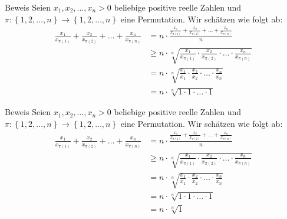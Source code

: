 \documentclass[10pt]{beamer}
\begin{document}
\begin{frame}{Beweis}
    Seien \( x_{1}, x_{2}, \ldots, x_{n} > 0 \) beliebige positive reelle Zahlen und \( \pi: \left\{ 1, 2, \ldots, n \right\} \to \left\{ 1, 2, \ldots, n \right\} \) eine Permutation. Wir schätzen wie folgt ab:
    \begin{align*}
        \frac{x_{1}}{x_{\pi\left( 1 \right)}} + \frac{x_{2}}{x_{\pi\left( 2 \right)}} + \ldots + \frac{x_{n}}{x_{\pi\left( n \right)}}
        & = n \cdot \frac{\frac{x_{1}}{x_{\pi\left( 1 \right)}} + \frac{x_{2}}{x_{\pi\left( 2 \right)}} + \ldots + \frac{x_{n}}{x_{\pi\left( n \right)}}}{n} \\
        & \geq n \cdot \sqrt[n]{\frac{x_{1}}{x_{\pi\left( 1 \right)}} \cdot \frac{x_{2}}{x_{\pi\left( 2 \right)}} \cdot \ldots \cdot \frac{x_{n}}{x_{\pi\left( n \right)}}} \\
        & = n \cdot \sqrt[n]{\frac{x_{1}}{x_{1}} \cdot \frac{x_{2}}{x_{2}} \cdot \ldots \cdot \frac{x_{n}}{x_{n}}} \\
        & = n \cdot \sqrt[n]{1 \cdot 1 \cdot \ldots \cdot 1}
    \end{align*}
\end{frame}



\begin{frame}{Beweis}
    Seien \( x_{1}, x_{2}, \ldots, x_{n} > 0 \) beliebige positive reelle Zahlen und \( \pi: \left\{ 1, 2, \ldots, n \right\} \to \left\{ 1, 2, \ldots, n \right\} \) eine Permutation. Wir schätzen wie folgt ab:
    \begin{align*}
        \frac{x_{1}}{x_{\pi\left( 1 \right)}} + \frac{x_{2}}{x_{\pi\left( 2 \right)}} + \ldots + \frac{x_{n}}{x_{\pi\left( n \right)}}
        & = n \cdot \frac{\frac{x_{1}}{x_{\pi\left( 1 \right)}} + \frac{x_{2}}{x_{\pi\left( 2 \right)}} + \ldots + \frac{x_{n}}{x_{\pi\left( n \right)}}}{n} \\
        & \geq n \cdot \sqrt[n]{\frac{x_{1}}{x_{\pi\left( 1 \right)}} \cdot \frac{x_{2}}{x_{\pi\left( 2 \right)}} \cdot \ldots \cdot \frac{x_{n}}{x_{\pi\left( n \right)}}} \\
        & = n \cdot \sqrt[n]{\frac{x_{1}}{x_{1}} \cdot \frac{x_{2}}{x_{2}} \cdot \ldots \cdot \frac{x_{n}}{x_{n}}} \\
        & = n \cdot \sqrt[n]{1 \cdot 1 \cdot \ldots \cdot 1} \\
        & = n \cdot \sqrt[n]{1}
    \end{align*}
\end{frame}
\end{document}
